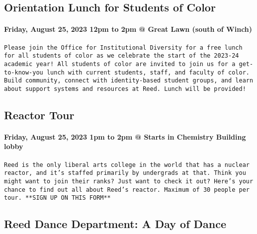 \documentclass[
]{article}
\begin{document}
\hypertarget{orientation-lunch-for-students-of-color}{%
\subsection{Orientation Lunch for Students of
Color}\label{orientation-lunch-for-students-of-color}}

\hypertarget{friday-august-25-2023-12pm-to-2pm-great-lawn-south-of-winch}{%
\paragraph{Friday, August 25, 2023 12pm to 2pm @ Great Lawn (south of
Winch)}\label{friday-august-25-2023-12pm-to-2pm-great-lawn-south-of-winch}}

\begin{verbatim}
Please join the Office for Institutional Diversity for a free lunch for all students of color as we celebrate the start of the 2023-24 academic year! All students of color are invited to join us for a get-to-know-you lunch with current students, staff, and faculty of color. Build community, connect with identity-based student groups, and learn about support systems and resources at Reed. Lunch will be provided!
\end{verbatim}

\hypertarget{reactor-tour}{%
\subsection{Reactor Tour}\label{reactor-tour}}

\hypertarget{friday-august-25-2023-1pm-to-2pm-starts-in-chemistry-building-lobby}{%
\paragraph{Friday, August 25, 2023 1pm to 2pm @ Starts in Chemistry
Building
lobby}\label{friday-august-25-2023-1pm-to-2pm-starts-in-chemistry-building-lobby}}

\begin{verbatim}
Reed is the only liberal arts college in the world that has a nuclear reactor, and it’s staffed primarily by undergrads at that. Think you might want to join their ranks? Just want to check it out? Here’s your chance to find out all about Reed’s reactor. Maximum of 30 people per tour. **SIGN UP ON THIS FORM**
\end{verbatim}

\hypertarget{reed-dance-department-a-day-of-dance}{%
\subsection{Reed Dance Department: A Day of
Dance}\label{reed-dance-department-a-day-of-dance}}
\end{document}
